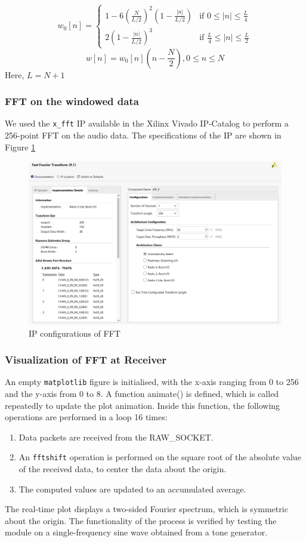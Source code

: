 \begin{equation}
    w_0[n]=
    \begin{cases}
        1 - 6(\frac{N}{L/2})^2(1 - \frac{|n|}{L/2}) & \text{if } 0 \leq |n| \leq \frac{L}{4}\\
        2(1 - \frac{|n|}{L/2})^3 & \text{if } \frac{L}{4} \leq |n| \leq \frac{L}{2}
    \end{cases}
\end{equation}
\begin{equation}
    w[n]= w_0[n](n - \frac{N}{2}), 0 \leq n \leq N    
\end{equation}
Here, $L = N + 1$

\subsubsection{FFT on the windowed data}
We used the \texttt{x\_fft} IP available in the Xilinx Vivado IP-Catalog to perform a 256-point FFT on the audio data. The specifications of the IP are shown in Figure \ref{fig:fft-ip}

\begin{figure}[htbp]
\centering
\includegraphics[width=.7\textwidth]{Sections/IMPLEMENTATION/images/fft-ip.png}
\caption{IP configurations of FFT}
\label{fig:fft-ip}
\end{figure}


\subsubsection{Visualization of FFT at Receiver}
An empty \texttt{matplotlib} figure is initialised, with the x-axis ranging from 0 to 256 and the y-axis from 0 to 8. A function animate() is defined, which is called repeatedly to update the plot animation. Inside this function, the following operations are performed in a loop 16 times:
\begin{enumerate}
    \item Data packets are received from the RAW\_SOCKET.
    \item An \texttt{fftshift} operation is performed on the square root of the absolute value of the received data, to center the data about the origin.
    \item The computed values are updated to an accumulated average.
\end{enumerate}
 
The real-time plot displays a two-sided Fourier spectrum, which is symmetric about the origin. The functionality of the process is verified by testing the module on a single-frequency sine wave obtained from a tone generator.


